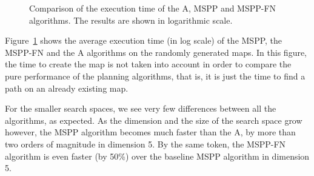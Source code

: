 \documentclass[letterpaper, 10 pt, conference]{ieeeconf}
\theoremstyle{definition}
\begin{document}
\begin{figure}[ht]
\centering
{} \caption{Comparison of the execution time of the A, MSPP and MSPP-FN algorithms. The results are shown in logarithmic scale.}
\label{comparison}
\end{figure}

Figure~\ref{comparison} shows the average execution time (in log scale) of the MSPP, the MSPP-FN and the A algorithms on the randomly generated maps.
In this figure, the time to create the map is not taken into account in order to compare the pure performance of the planning algorithms, that is, it is just the time to find a path on an already existing map.

For the smaller search spaces, we see very few differences between all the algorithms, as expected.
As the dimension and the size of the search space grow however, the MSPP algorithm becomes much faster than the A, by more than two orders of magnitude in dimension 5. By the same token,
the MSPP-FN algorithm is even faster (by 50\%) over the baseline MSPP algorithm in dimension 5.
\end{document}
